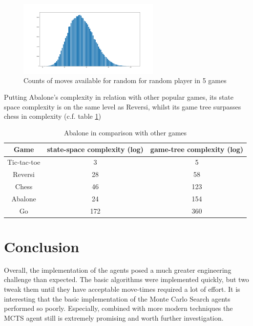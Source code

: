 \documentclass{../llncs}
\begin{document}
\begin{figure}
	\centering
	\includegraphics[width=7cm, keepaspectratio]{distribution_of_moves.png}
	\caption{Counts of moves available for random for random player in 5 games}
\end{figure}

Putting Abalone's complexity in relation with other popular games, its state space complexity is on the same level as Reversi, whilst its game tree surpasses chess in complexity (c.f. table \ref{complexity_table})

\begin{table}
	\begin{center}
		\begin{tabular}{ | c | c | c | }
			\hline
			Game        & state-space complexity (log) & game-tree complexity (log) \\
			\hline
			Tic-tac-toe & 3                            & 5                          \\
			\hline
			Reversi     & 28                           & 58                         \\
			\hline
			Chess       & 46                           & 123                        \\
			\hline
			Abalone     & 24                           & 154                        \\
			\hline
			Go          & 172                          & 360                        \\
			\hline
		\end{tabular}
	\end{center}
	\caption{Abalone in comparison with other games \cite{chorus_implementing_2009}}
	\label{complexity_table}
\end{table}



\section{Conclusion}
Overall, the implementation of the agents posed a much greater engineering challenge than expected. The basic algorithms were implemented quickly, but two tweak them until they have acceptable move-times required a lot of effort. It is interesting that the basic implementation of the Monte Carlo Search agents performed so poorly. Especially, combined with more modern techniques the MCTS agent still is extremely promising and worth further investigation.



\end{document}
